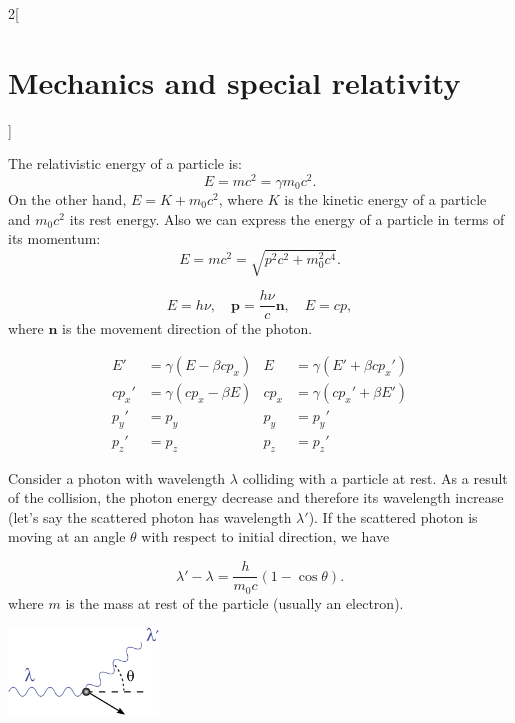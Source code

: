 \documentclass[class=article,10pt,crop=false]{standalone}
\begin{document}
\begin{multicols}{2}[\section{Mechanics and special relativity}]
\begin{concept}
\end{concept}
\begin{concept}
The relativistic energy of a particle is: $$E=mc^2=\gamma m_0c^2.$$ On the other hand, $E=K+m_0c^2$, where $K$ is the kinetic energy of a particle and $m_0c^2$ its rest energy. Also we can express the energy of a particle in terms of its momentum:
$$E=mc^2=\sqrt{p^2c^2+m_0^2c^4}.$$
\end{concept}
\begin{concept}
$$E=h\nu,\quad\boldsymbol{p}=\frac{h\nu}{c}\boldsymbol{n},\quad E=cp,$$ where $\boldsymbol{n}$ is the movement direction of the photon.
\end{concept}
\begin{concept}
\begin{align*}
    E'&=\gamma(E-\beta cp_x) & E&=\gamma(E'+\beta cp_x')\\
    cp_x'&=\gamma(cp_x-\beta E) & cp_x&=\gamma(cp_x'+\beta E')\\
    p_y'&=p_y & p_y&=p_y'\\
    p_z'&=p_z & p_z&=p_z'
\end{align*}
\end{concept}
\begin{concept}
Consider a photon with wavelength $\lambda$ colliding with a particle at rest. As a result of the collision, the photon energy decrease and therefore its wavelength increase (let's say the scattered photon has wavelength $\lambda'$). If the scattered photon is moving at an angle $\theta$ with respect to initial direction, we have
\end{concept}
$$\lambda'-\lambda=\frac{h}{m_0c}(1-\cos\theta).$$
where $m$ is the mass at rest of the particle (usually an electron).
\begin{minipage}{\linewidth}
    \centering
    \includegraphics[width=4cm]{Physics/1st/Mechanics_and_special_relativity/Images/comp.jpg}
\end{minipage}

\end{multicols}
\end{document}
